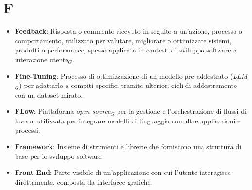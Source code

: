 \section{F}
\begin{itemize}
    \item \textbf{Feedback}: Risposta o commento ricevuto in seguito a un'azione, processo o comportamento, utilizzato per valutare, migliorare o ottimizzare sistemi, prodotti o performance, spesso applicato in contesti di sviluppo software o interazione utente$_G$.
    \item \textbf{Fine-Tuning}: Processo di ottimizzazione di un modello pre-addestrato (\textit{LLM}$_G$) per adattarlo a compiti specifici tramite ulteriori cicli di addestramento con un dataset mirato.
    \item \textbf{FLow}: Piattaforma \textit{open-source}$_G$ per la gestione e l'orchestrazione di flussi di lavoro, utilizzata per integrare modelli di linguaggio con altre applicazioni e processi.
    \item \textbf{Framework}: Insieme di strumenti e librerie che forniscono una struttura di base per lo sviluppo software.
    \item \textbf{Front End}: Parte visibile di un'applicazione con cui l'utente interagisce direttamente, composta da interfacce grafiche.
\end{itemize}
